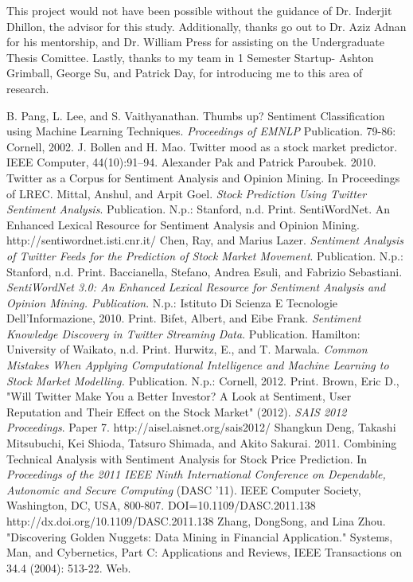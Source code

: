 \documentclass[preprint,pre,floats,aps,amsmath,amssymb,12pt]{revtex4}
\begin{document}
\begin{acknowledgments}

This project would not have been possible without the guidance of Dr. Inderjit Dhillon, the advisor for this study. Additionally, thanks go out to Dr. Aziz Adnan for his mentorship, and Dr. William Press for assisting on the Undergraduate Thesis Comittee. Lastly, thanks to my team in 1 Semester Startup- Ashton Grimball, George Su, and Patrick Day, for introducing me to this area of research. 

\end{acknowledgments}




\begin{thebibliography}{99}

B. Pang, L. Lee, and S. Vaithyanathan. Thumbs up? Sentiment Classification using Machine Learning Techniques. {\it Proceedings of EMNLP} Publication. 79-86: Cornell, 2002. 
J. Bollen and H. Mao. Twitter mood as a stock market predictor. IEEE Computer, 44(10):91–94.	
Alexander Pak and Patrick Paroubek. 2010. Twitter as a Corpus for Sentiment Analysis and Opinion Mining. In Proceedings of LREC. 
Mittal, Anshul, and Arpit Goel. {\it Stock Prediction Using Twitter Sentiment Analysis}. Publication. N.p.: Stanford, n.d. Print.
SentiWordNet. An Enhanced Lexical Resource for Sentiment Analysis and Opinion Mining. http://sentiwordnet.isti.cnr.it/
Chen, Ray, and Marius Lazer. {\it Sentiment Analysis of Twitter Feeds for the Prediction of Stock Market Movement}. Publication. N.p.: Stanford, n.d. Print.
 Baccianella, Stefano, Andrea Esuli, and Fabrizio Sebastiani. {\it SentiWordNet 3.0: An Enhanced Lexical Resource for Sentiment Analysis and Opinion Mining. Publication}. N.p.: Istituto Di Scienza E Tecnologie Dell'Informazione, 2010. Print.
Bifet, Albert, and Eibe Frank. {\it Sentiment Knowledge Discovery in Twitter Streaming Data}. Publication. Hamilton: University of Waikato, n.d. Print.
Hurwitz, E., and T. Marwala. {\it Common Mistakes When Applying Computational Intelligence and Machine Learning to Stock Market Modelling. \it} Publication. N.p.: Cornell, 2012. Print.
Brown, Eric D., "Will Twitter Make You a Better Investor? A Look at Sentiment, User Reputation and Their Effect on the Stock Market" (2012). {\it SAIS 2012 Proceedings}. Paper 7.
http://aisel.aisnet.org/sais2012/
Shangkun Deng, Takashi Mitsubuchi, Kei Shioda, Tatsuro Shimada, and Akito Sakurai. 2011. Combining Technical Analysis with Sentiment Analysis for Stock Price Prediction. In {\it Proceedings of the 2011 IEEE Ninth International Conference on Dependable, Autonomic and Secure Computing} (DASC '11). IEEE Computer Society, Washington, DC, USA, 800-807. DOI=10.1109/DASC.2011.138 http://dx.doi.org/10.1109/DASC.2011.138
Zhang, DongSong, and Lina Zhou. "Discovering Golden Nuggets: Data Mining in Financial Application." Systems, Man, and Cybernetics, Part C: Applications and Reviews, IEEE Transactions on 34.4 (2004): 513-22. Web.

\end{thebibliography}
\end{document}
